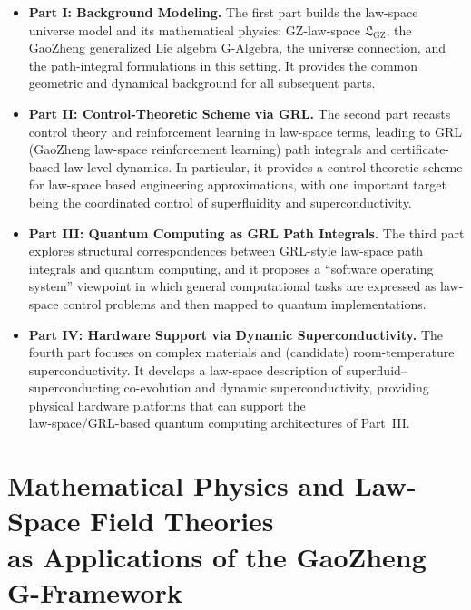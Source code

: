 \documentclass[11pt]{book}
\newcommand{\GAlgebra}{\text{G-Algebra}}
\newcommand{\GZLS}{\ensuremath{\mathfrak{L}_{\mathrm{GZ}}}}
\theoremstyle{plain}
\theoremstyle{definition}
\theoremstyle{remark}
\begin{document}
\begin{itemize}
  \item \textbf{Part I: Background Modeling.}
        The first part builds the law-space universe model and its
        mathematical physics: GZ-law-space $\GZLS$, the GaoZheng
        generalized Lie algebra $\GAlgebra$, the universe connection,
        and the path-integral formulations in this setting. It
        provides the common geometric and dynamical background for
        all subsequent parts.
  \item \textbf{Part II: Control-Theoretic Scheme via GRL.}
        The second part recasts control theory and reinforcement
        learning in law-space terms, leading to GRL (GaoZheng
        law-space reinforcement learning) path integrals and
        certificate-based law-level dynamics. In particular, it
        provides a control-theoretic scheme for law-space based
        engineering approximations, with one important target being
        the coordinated control of superfluidity and superconductivity.
  \item \textbf{Part III: Quantum Computing as GRL Path Integrals.}
        The third part explores structural correspondences between
        GRL-style law-space path integrals and quantum computing,
        and it proposes a ``software operating system'' viewpoint in
        which general computational tasks are expressed as
        law-space control problems and then mapped to quantum
        implementations.
  \item \textbf{Part IV: Hardware Support via Dynamic Superconductivity.}
        The fourth part focuses on complex materials and
        (candidate) room-temperature superconductivity. It develops
        a law-space description of superfluid–superconducting
        co-evolution and dynamic superconductivity, providing
        physical hardware platforms that can support the \\
        law-space/GRL-based quantum computing architectures of
        Part~III.
\end{itemize}



\tableofcontents



\mainmatter



\part[Mathematical Physics and Law-Space Field Theories]{Mathematical Physics and Law-Space Field Theories\\
      as Applications of the GaoZheng G-Framework}
\end{document}
